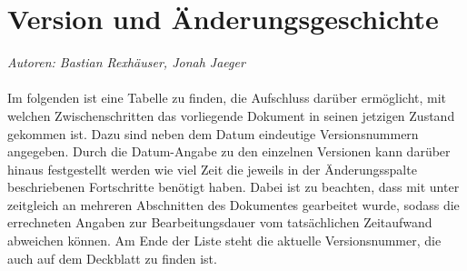\documentclass[enabledeprecatedfontcommands,fontsize=11pt,paper=a4,twoside]{scrartcl}
\newcounter{one}
\renewcommand{\headrulewidth}{0pt}
\begin{document}
	\thispagestyle{empty}
	\cleardoublepage
	\newpage
	
	\thispagestyle{fancy}
	\fancyhead{}
	\fancyfoot{}
	\renewcommand{\headrulewidth}{0.4pt}
	\tableofcontents
	
	\newpage
	
	
	
	\thispagestyle{empty}
	\cleardoublepage
	
	\section*{Version und Änderungsgeschichte}
	\emph{Autoren: Bastian Rexhäuser, Jonah Jaeger}\\ \\
	Im folgenden ist eine Tabelle zu finden, die Aufschluss darüber ermöglicht, mit welchen Zwischenschritten das vorliegende Dokument in seinen jetzigen Zustand gekommen ist. Dazu sind neben dem Datum eindeutige Versionsnummern angegeben. Durch die Datum-Angabe zu den einzelnen Versionen kann darüber hinaus festgestellt werden wie viel Zeit die jeweils in der Änderungsspalte beschriebenen Fortschritte benötigt haben. Dabei ist zu beachten, dass mit unter zeitgleich an mehreren Abschnitten des Dokumentes gearbeitet wurde, sodass die errechneten Angaben zur Bearbeitungsdauer vom tatsächlichen Zeitaufwand abweichen können. Am Ende der Liste steht die aktuelle Versionsnummer, die auch auf dem Deckblatt zu finden ist.  \\
	
\end{document}
